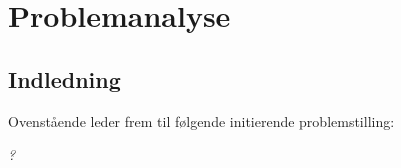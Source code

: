 \part{Problemanalyse}
\label{cha:problemanalyse}

\chapter{Indledning}




Ovenstående leder frem til følgende initierende problemstilling:
\begin{center}
\textit{?}
\end{center}